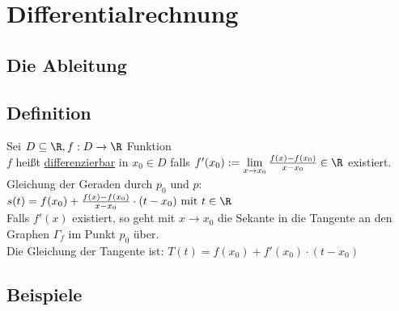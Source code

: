 \chapter{Differentialrechnung}
\section*{Die Ableitung}
\section{Definition}
Sei $D\subseteq \R, f: D \to \R$ Funktion\\
$f$ heißt \ul{differenzierbar} in $x_0\in D$ falls $f'(x_0) := \lim\limits_{x\to x_0} \frac{f(x) - f(x_0)}{x - x_0} \in \R$ existiert.
Gleichung der Geraden durch $p_0$ und $p$:\\
$s(t) = f(x_0) + \frac{f(x) - f(x_0)}{x-x_0} \cdot (t-x_0) \text{ mit } t\in \R$\\
Falls $f'(x)$ existiert, so geht mit $x\to x_0$ die Sekante in die Tangente an den Graphen $\Gamma_f$ im Punkt $p_0$ über. \\
Die Gleichung der Tangente ist: $T(t) = f(x_0) + f'(x_0) \cdot (t-x_0)$
\section{Beispiele}
